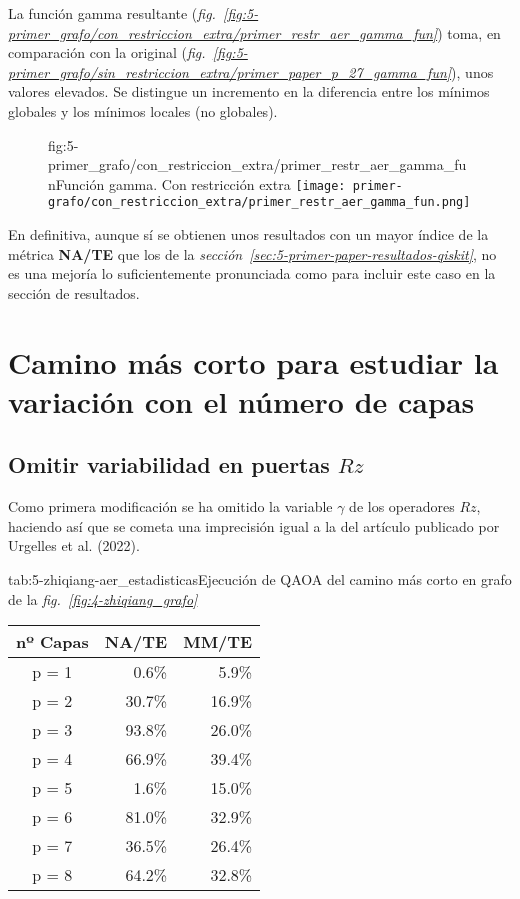 La función gamma resultante (\textit{fig.~\ref{fig:5-primer_grafo/con_restriccion_extra/primer_restr_aer_gamma_fun}}) toma, en comparación con la original (\textit{fig.~\ref{fig:5-primer_grafo/sin_restriccion_extra/primer_paper_p_27_gamma_fun}}), unos valores elevados.
Se distingue un incremento en la diferencia entre los mínimos globales y los mínimos locales (no globales).

\begin{figure}[Resultados QAOA {--} artículo de Fan et al. (2023) {--} función gamma con restricción extra]{fig:5-primer_grafo/con_restriccion_extra/primer_restr_aer_gamma_fun}{Función gamma. Con restricción extra}
  \centering
  \texttt{[image: primer-grafo/con\_restriccion\_extra/primer\_restr\_aer\_gamma\_fun.png]}
\end{figure}

En definitiva, aunque sí se obtienen unos resultados con un mayor índice de la métrica \textbf{NA/TE} que los de la \textit{sección~\ref{sec:5-primer-paper-resultados-qiskit}}, no es una mejoría lo suficientemente pronunciada como para incluir este caso en la sección de resultados.


\section{Camino más corto para estudiar la variación con el número de capas\label{sec:8-zhiqiang}}

\subsection{Omitir variabilidad en puertas $Rz$}

Como primera modificación se ha omitido la variable $\gamma$ de los operadores $Rz$, haciendo así que se cometa una imprecisión igual a la del artículo publicado por Urgelles et al. (2022)\cite{multi-objective_routing_optimization}.

\begin{table}[Resultados QAOA {--} artículo de Fan et al. (2023) {--} puertas $Rz$ constantes]{tab:5-zhiqiang-aer_estadisticas}{Ejecución de QAOA del camino más corto en grafo de la \textit{fig.~\ref{fig:4-zhiqiang_grafo}}}
  \centering
  \begin{tabular}{|c|r|r|}
    \hline
    \textbf{nº Capas} & \textbf{NA/TE} & \textbf{MM/TE} \\ \hline
    p = 1 &  0.6\% &  5.9\% \\ \hline
    p = 2 & 30.7\% & 16.9\% \\ \hline
    p = 3 & 93.8\% & 26.0\% \\ \hline
    p = 4 & 66.9\% & 39.4\% \\ \hline
    p = 5 &  1.6\% & 15.0\% \\ \hline
    p = 6 & 81.0\% & 32.9\% \\ \hline
    p = 7 & 36.5\% & 26.4\% \\ \hline
    p = 8 & 64.2\% & 32.8\% \\ \hline
  \end{tabular}
\end{table}

